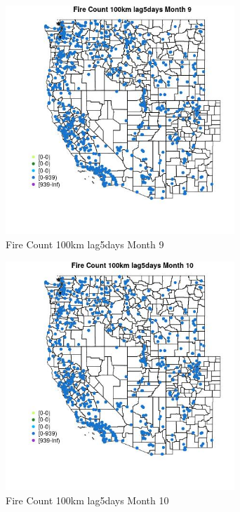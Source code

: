 \begin{figure} 
\centering  
\includegraphics[width=0.77\textwidth]{Code_Outputs/Report_ML_input_PM25_Step4_part_e_de_duplicated_aves_compiled_2019-05-21wNAs_MapObsMo9Fire_Count_100km_lag5days.jpg} 
\caption{\label{fig:Report_ML_input_PM25_Step4_part_e_de_duplicated_aves_compiled_2019-05-21wNAsMapObsMo9Fire_Count_100km_lag5days}Fire Count 100km lag5days Month 9} 
\end{figure} 
 

\begin{figure} 
\centering  
\includegraphics[width=0.77\textwidth]{Code_Outputs/Report_ML_input_PM25_Step4_part_e_de_duplicated_aves_compiled_2019-05-21wNAs_MapObsMo10Fire_Count_100km_lag5days.jpg} 
\caption{\label{fig:Report_ML_input_PM25_Step4_part_e_de_duplicated_aves_compiled_2019-05-21wNAsMapObsMo10Fire_Count_100km_lag5days}Fire Count 100km lag5days Month 10} 
\end{figure} 
 

